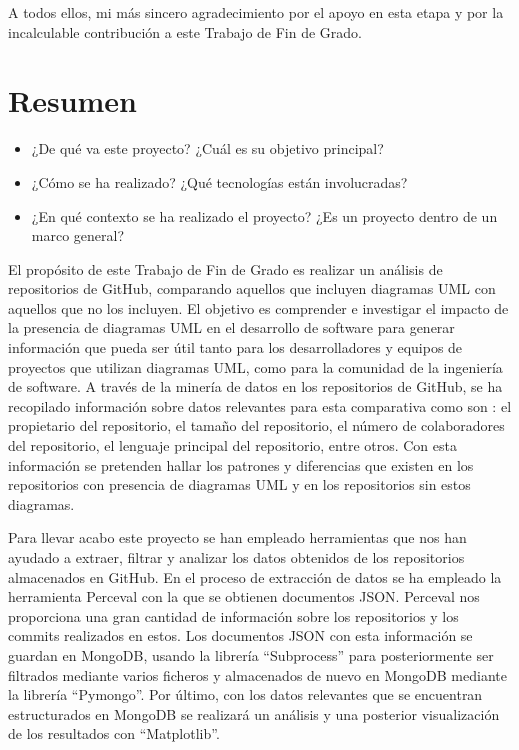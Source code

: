 \documentclass[a4paper, 12pt]{book}
\begin{document}
A todos ellos, mi más sincero agradecimiento por el apoyo en esta etapa y por la incalculable contribución a este Trabajo de Fin de Grado.
 


\chapter*{Resumen}

\begin{itemize}
  \item ¿De qué va este proyecto? ¿Cuál es su objetivo principal?
  \item ¿Cómo se ha realizado? ¿Qué tecnologías están involucradas?
  \item ¿En qué contexto se ha realizado el proyecto? ¿Es un proyecto dentro de un marco general?
\end{itemize}

El propósito de este Trabajo de Fin de Grado es realizar un análisis de repositorios de GitHub, comparando aquellos que incluyen diagramas UML con aquellos que no los incluyen. 
El objetivo es comprender e investigar el impacto de la presencia de diagramas UML en el desarrollo de software para generar información que pueda ser útil tanto para los desarrolladores y equipos de proyectos que utilizan diagramas UML, como para la comunidad de la ingeniería de software. 
A través de la minería de datos en los repositorios de GitHub, se ha recopilado información sobre datos relevantes para esta comparativa como son : el propietario del repositorio, el tamaño del repositorio, el número de colaboradores del repositorio, el lenguaje principal del repositorio, entre otros.
Con esta información se pretenden hallar los patrones y diferencias que existen en los repositorios con presencia de diagramas UML y en los repositorios sin estos diagramas. 


Para llevar acabo este proyecto se han empleado herramientas que nos han ayudado a extraer, filtrar y analizar los datos obtenidos de los repositorios almacenados en GitHub.
En el proceso de extracción de datos se ha empleado la herramienta Perceval con la que se obtienen documentos JSON.
Perceval nos proporciona una gran cantidad de información sobre los repositorios y los commits realizados en estos.
Los documentos JSON con esta información se guardan en MongoDB, usando la librería ``Subprocess'' para posteriormente ser filtrados mediante varios ficheros y almacenados de nuevo en MongoDB mediante la librería ``Pymongo''.
Por último, con los datos relevantes que se encuentran estructurados en MongoDB se realizará un análisis y una posterior visualización de los resultados con ``Matplotlib''.  
\end{document}
